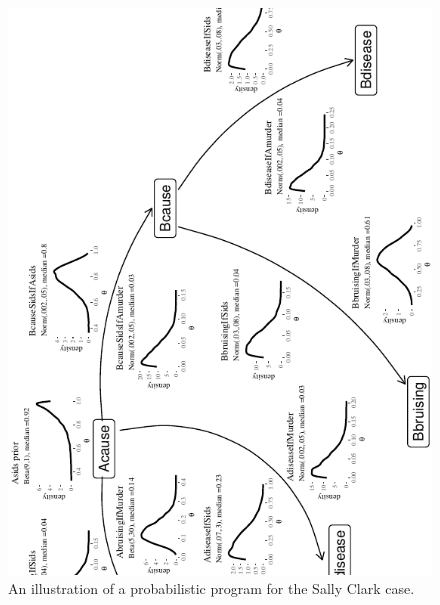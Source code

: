 \documentclass[
  letterpaper,
  DIV=11,
  numbers=noendperiod]{scrartcl}
\begin{document}
\begin{figure}[h]

{\centering \includegraphics[width=1.25\textwidth,height=2.3\textheight]{imp_philosophical_backup_files/figure-pdf/fig-scwithhop-1.pdf}

}

\caption{\label{fig-scwithhop}An illustration of a probabilistic program
for the Sally Clark case.}

\end{figure}

\end{document}
